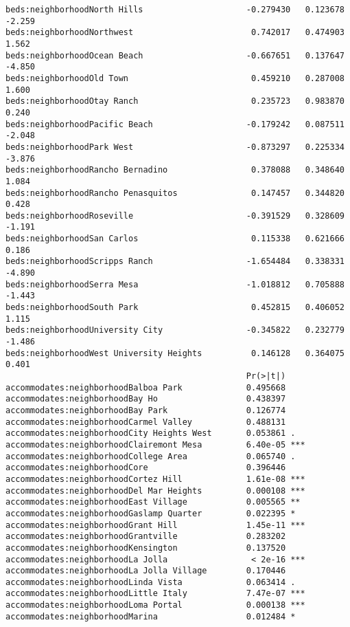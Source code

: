 \documentclass[
  letterpaper,
  krantz2]{style/krantz}
\begin{document}
\begin{verbatim}
beds:neighborhoodNorth Hills                     -0.279430   0.123678  -2.259
beds:neighborhoodNorthwest                        0.742017   0.474903   1.562
beds:neighborhoodOcean Beach                     -0.667651   0.137647  -4.850
beds:neighborhoodOld Town                         0.459210   0.287008   1.600
beds:neighborhoodOtay Ranch                       0.235723   0.983870   0.240
beds:neighborhoodPacific Beach                   -0.179242   0.087511  -2.048
beds:neighborhoodPark West                       -0.873297   0.225334  -3.876
beds:neighborhoodRancho Bernadino                 0.378088   0.348640   1.084
beds:neighborhoodRancho Penasquitos               0.147457   0.344820   0.428
beds:neighborhoodRoseville                       -0.391529   0.328609  -1.191
beds:neighborhoodSan Carlos                       0.115338   0.621666   0.186
beds:neighborhoodScripps Ranch                   -1.654484   0.338331  -4.890
beds:neighborhoodSerra Mesa                      -1.018812   0.705888  -1.443
beds:neighborhoodSouth Park                       0.452815   0.406052   1.115
beds:neighborhoodUniversity City                 -0.345822   0.232779  -1.486
beds:neighborhoodWest University Heights          0.146128   0.364075   0.401
                                                 Pr(>|t|)    
accommodates:neighborhoodBalboa Park             0.495668    
accommodates:neighborhoodBay Ho                  0.438397    
accommodates:neighborhoodBay Park                0.126774    
accommodates:neighborhoodCarmel Valley           0.488131    
accommodates:neighborhoodCity Heights West       0.053861 .  
accommodates:neighborhoodClairemont Mesa         6.40e-05 ***
accommodates:neighborhoodCollege Area            0.065740 .  
accommodates:neighborhoodCore                    0.396446    
accommodates:neighborhoodCortez Hill             1.61e-08 ***
accommodates:neighborhoodDel Mar Heights         0.000108 ***
accommodates:neighborhoodEast Village            0.005565 ** 
accommodates:neighborhoodGaslamp Quarter         0.022395 *  
accommodates:neighborhoodGrant Hill              1.45e-11 ***
accommodates:neighborhoodGrantville              0.283202    
accommodates:neighborhoodKensington              0.137520    
accommodates:neighborhoodLa Jolla                 < 2e-16 ***
accommodates:neighborhoodLa Jolla Village        0.170446    
accommodates:neighborhoodLinda Vista             0.063414 .  
accommodates:neighborhoodLittle Italy            7.47e-07 ***
accommodates:neighborhoodLoma Portal             0.000138 ***
accommodates:neighborhoodMarina                  0.012484 *  

\end{verbatim}
\end{document}
